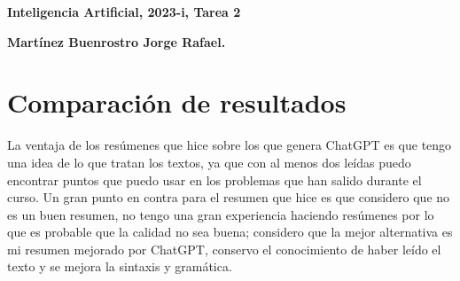 \documentclass[12pt,twoside]{article}
\date{}
\begin{document}
    \centerline{\bf Inteligencia Artificial, 2023-i, Tarea 2}
    \centerline{}
    \centerline{\bf {Martínez Buenrostro Jorge Rafael.}}
    
    
    \section*{Comparación de resultados}
    \noindent La ventaja de los resúmenes que hice sobre los que genera ChatGPT es que tengo una idea de lo que tratan los textos, ya que con al menos dos leídas puedo encontrar puntos que puedo usar en los problemas que han salido durante el curso. Un gran punto en contra para el resumen que hice es que considero que no es un buen resumen, no tengo una gran experiencia haciendo resúmenes por lo que es probable que la calidad no sea buena; considero que la mejor alternativa es mi resumen mejorado por ChatGPT, conservo el conocimiento de haber leído el texto y se mejora la sintaxis y gramática.
    
\end{document}
